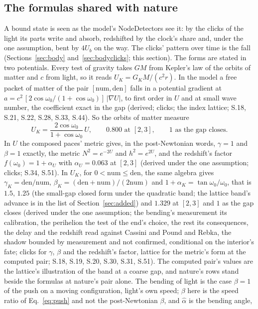 \documentclass[pdflatex,sn-mathphys-num]{sn-jnl}
\newcommand{\num}{\mathrm{num}}
\newcommand{\den}{\mathrm{den}}
\theoremstyle{thmstyleone}
\theoremstyle{thmstyletwo}
\begin{document}
\subsection{The formulas shared with nature}\label{sec:shared}

A bound state is seen as the model's NodeDetectors see it: by the clicks of the light its parts write and absorb, redshifted by the clock's share and, under the one assumption, bent by $4U_b$ on the way. The clicks' pattern over time is the fall (Sections~\ref{sec:body} and~\ref{sec:bodyclicks}; this section). The forms are stated in two potentials. Every test of gravity takes $GM$ from Kepler's law of the orbits of matter and $c$ from light, so it reads $U_K = G_K M / (c^2 r)$. In the model a free packet of matter of the pair $[\num, \den]$ falls in a potential gradient at $a = c^2\,[2\cos\omega_0 / (1 + \cos\omega_0)]\,|\nabla U|$, to first order in $U$ and at small wave number, the coefficient exact in the gap (derived; clicks; the index lattice; S.18, S.21, S.22, S.28, S.33, S.44). So the orbits of matter measure
\begin{equation}\label{eq:kepler}
\boxed{U_K = \frac{2\cos\omega_0}{1 + \cos\omega_0}\,U, \qquad 0.800 \text{ at } [2, 3], \qquad 1 \text{ as the gap closes}}.
\end{equation}
In $U$ the composed paces' metric gives, in the post-Newtonian words, $\gamma = 1$ and $\beta = 1$ exactly, the metric $N^2 = e^{-2U}$ and $h^2 = e^{2U}$, and the redshift's factor $f(\omega_0) = 1 + \alpha_U$ with $\alpha_U = 0.063$ at $[2, 3]$ (derived under the one assumption; clicks; S.34, S.51). In $U_K$, for $0 < \num \le \den$, the same algebra gives $\gamma_K = \den / \num$, $\beta_K = (\den + \num) / (2\num)$ and $1 + \alpha_K = \tan\omega_0 / \omega_0$, that is $1.5$, $1.25$ (the small-gap closed form under the quadratic band; the lattice band's advance is in the list of Section~\ref{sec:added}) and $1.329$ at $[2, 3]$ and $1$ as the gap closes (derived under the one assumption; the bending's measurement its calibration, the perihelion the test of the end's choice, the rest its consequences, the delay and the redshift read against Cassini and Pound and Rebka, the shadow bounded by measurement and not confirmed, conditional on the interior's fate; clicks for $\gamma$, $\beta$ and the redshift's factor, lattice for the metric's form at the computed pair; S.18, S.19, S.20, S.30, S.31, S.51). The computed pair's values are the lattice's illustration of the band at a coarse gap, and nature's rows stand beside the formulas at nature's pair alone. The bending of light is the case $\beta = 1$ of the push on a moving configuration, light's own speed; $\beta$ here is the speed ratio of Eq.~\eqref{eq:push} and not the post-Newtonian $\beta$, and $\hat\alpha$ is the bending angle,
\end{document}
